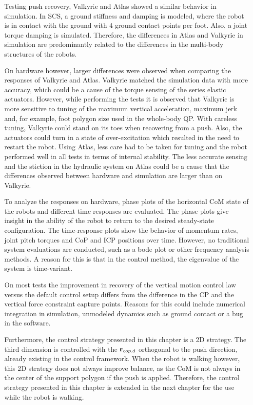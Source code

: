 Testing push recovery, Valkyrie and Atlas showed a similar behavior in simulation. In \ac{SCS}, a ground stiffness and damping is modeled, where the robot is in contact with the ground with $4$ ground contact points per foot. Also, a joint torque damping is simulated. Therefore, the differences in Atlas and Valkyrie in simulation are predominantly related to the differences in the multi-body structures of the robots.

On hardware however, larger differences were observed when comparing the responses of Valkyrie and Atlas. Valkyrie matched the simulation data with more accuracy, which could be a cause of the torque sensing of the series elastic actuators. However, while performing the tests it is observed that Valkyrie is more sensitive to tuning of the maximum vertical acceleration, maximum jerk and, for example, foot polygon size used in the whole-body \ac{QP}. With careless tuning, Valkyrie could stand on its toes when recovering from a push. Also, the actuators could turn in a state of over-excitation which resulted in the need to restart the robot. Using Atlas, less care had to be taken for tuning and the robot performed well in all tests in terms of internal stability. The less accurate sensing and the stiction in the hydraulic system on Atlas could be a cause that the differences observed between hardware and simulation are larger than on Valkyrie.

To analyze the responses on hardware, phase plots of the horizontal \ac{CoM} state of the robots and different time responses are evaluated. The phase plots give insight in the ability of the robot to return to the desired steady-state configuration. The time-response plots show the behavior of momentum rates, joint pitch torques and \ac{CoP} and \ac{ICP} positions over time. However, no traditional system evaluations are conducted, such as a bode plot or other frequency analysis methods. A reason for this is that in the control method, the eigenvalue of the system is time-variant.

On most tests the improvement in recovery of the vertical motion control law versus the default control setup differs  from the difference in the \ac{CP} and the vertical force constraint capture points. Reasons for this could include numerical integration in simulation, unmodeled dynamics such as ground contact or a bug in the software.

Furthermore, the control strategy presented in this chapter is a \ac{2D} strategy. The third dimension is controlled with the $\mathbf{r}_{cop,d}$ orthogonal to the push direction, already existing in the control framework. When the robot is walking however, this \ac{2D} strategy does not always improve balance, as the \ac{CoM} is not always in the center of the support polygon if the push is applied. Therefore, the control strategy presented in this chapter is extended in the next chapter for the use while the robot is walking.



